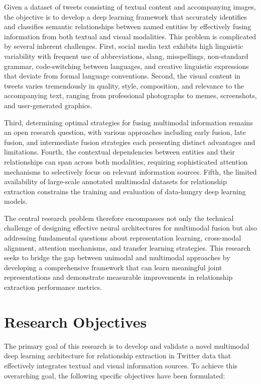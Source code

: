 \documentclass[12pt,a4paper]{report}
\begin{document}
Given a dataset of tweets consisting of textual content and accompanying images, the objective is to develop a deep learning framework that accurately identifies and classifies semantic relationships between named entities by effectively fusing information from both textual and visual modalities. This problem is complicated by several inherent challenges. First, social media text exhibits high linguistic variability with frequent use of abbreviations, slang, misspellings, non-standard grammar, code-switching between languages, and creative linguistic expressions that deviate from formal language conventions. Second, the visual content in tweets varies tremendously in quality, style, composition, and relevance to the accompanying text, ranging from professional photographs to memes, screenshots, and user-generated graphics.

Third, determining optimal strategies for fusing multimodal information remains an open research question, with various approaches including early fusion, late fusion, and intermediate fusion strategies each presenting distinct advantages and limitations. Fourth, the contextual dependencies between entities and their relationships can span across both modalities, requiring sophisticated attention mechanisms to selectively focus on relevant information sources. Fifth, the limited availability of large-scale annotated multimodal datasets for relationship extraction constrains the training and evaluation of data-hungry deep learning models.

The central research problem therefore encompasses not only the technical challenge of designing effective neural architectures for multimodal fusion but also addressing fundamental questions about representation learning, cross-modal alignment, attention mechanisms, and transfer learning strategies. This research seeks to bridge the gap between unimodal and multimodal approaches by developing a comprehensive framework that can learn meaningful joint representations and demonstrate measurable improvements in relationship extraction performance metrics.

\section{Research Objectives}

The primary goal of this research is to develop and validate a novel multimodal deep learning architecture for relationship extraction in Twitter data that effectively integrates textual and visual information sources. To achieve this overarching goal, the following specific objectives have been formulated:
\end{document}

